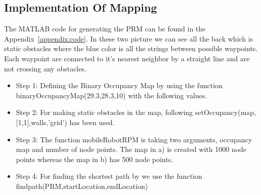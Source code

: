 \documentclass{article}
\begin{document}
	\subsection{Implementation Of Mapping}
	The MATLAB code for generating the PRM can be found in the Appendix~\ref{appendix:code}. In these two picture we can see all the back which is static obstacles where the blue color is all the strings between possible waypoints. Each waypoint are connected to it's nearest neighbor by a straight line and are not crossing any obstacles. 
	\begin{itemize}
		\item Step 1: Defining the Binary Occupancy Map by using the function binaryOccupancyMap(29.3,28.3,10) with the following values.
		\item Step 2: For making static obstacles in the map, following setOccupancy(map,[1,1],walls,'grid') has been used. 
		\item Step 3: The function mobileRobotRPM is taking two arguments, occupancy map and number of node points. The map in a) is created with 1000 node points whereas the map in b) has 500 node points. 
		\item Step 4: For finding the shortest path by we use the function findpath(PRM,startLocation,endLocation)
	\end{itemize}
	
\end{document}
